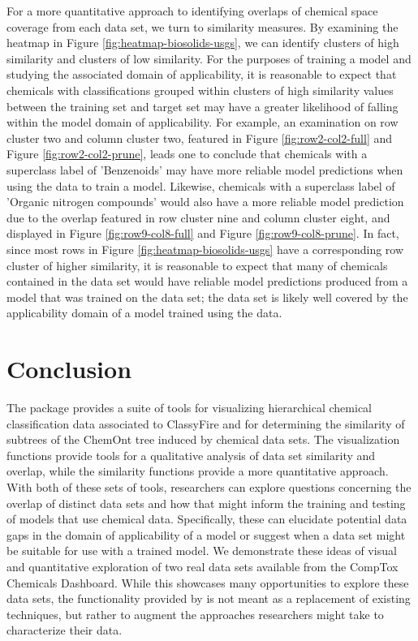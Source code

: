 \documentclass[article]{jss}
\begin{document}
For a more quantitative approach to identifying overlaps of chemical space coverage from each data set, we turn to similarity measures. By examining the heatmap in Figure \ref{fig:heatmap-biosolids-usgs}, we can identify clusters of high similarity and clusters of low similarity. For the purposes of training a model and studying the associated domain of applicability, it is reasonable to expect that chemicals with classifications grouped within clusters of high similarity values between the training set and target set may have a greater likelihood of falling within the model domain of applicability. For example, an examination on row cluster two and column cluster two, featured in Figure \ref{fig:row2-col2-full} and Figure \ref{fig:row2-col2-prune}, leads one to conclude that chemicals with a superclass label of 'Benzenoids' may have more reliable model predictions when using the  data to train a model. Likewise, chemicals with a superclass label of 'Organic nitrogen compounds' would also have a more reliable model prediction due to the overlap featured in row cluster nine and column cluster eight, and displayed in Figure \ref{fig:row9-col8-full} and Figure \ref{fig:row9-col8-prune}. In fact, since most rows in Figure \ref{fig:heatmap-biosolids-usgs} have a corresponding row cluster of higher similarity, it is reasonable to expect that many of chemicals contained in the  data set would have reliable model predictions produced from a model that was trained on the  data set; the  data set is likely well covered by the applicability domain of a model trained using the  data.

\section{Conclusion} \label{sec:conc}

The  package  provides a suite of tools for visualizing hierarchical chemical classification data associated to ClassyFire and for determining the similarity of subtrees of the ChemOnt tree induced by chemical data sets. The visualization functions provide tools for a qualitative analysis of data set similarity and overlap, while the similarity functions provide a more quantitative approach. With both of these sets of tools, researchers can explore questions concerning the overlap of distinct data sets and how that might inform the training and testing of models that use chemical data. Specifically, these can elucidate potential data gaps in the domain of applicability of a model or suggest when a data set might be suitable for use with a trained model. We demonstrate these ideas of visual and quantitative exploration of two real data sets available from the CompTox Chemicals Dashboard. While this showcases many opportunities to explore these data sets, the functionality provided by  is not meant as a replacement of existing techniques, but rather to augment the approaches researchers might take to characterize their data.
\end{document}
